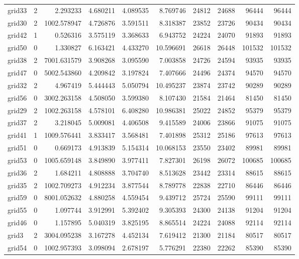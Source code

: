 \begin{longtable}{|l|r|r|r|r|r|r|r|r|r|}
grid33 & 2 & 2.293233 & 4.680211 & 4.089535 & 8.769746 & 24812 & 24688 & 96444 & 96444 \\
grid30 & 2 & 1002.578947 & 4.726876 & 3.591511 & 8.318387 & 23852 & 23726 & 90434 & 90434 \\
grid42 & 1 & 0.526316 & 3.575119 & 3.368633 & 6.943752 & 24224 & 24070 & 91893 & 91893 \\
grid50 & 0 & 1.330827 & 6.163421 & 4.433270 & 10.596691 & 26618 & 26448 & 101532 & 101532 \\
grid38 & 2 & 7001.631579 & 3.908268 & 3.095590 & 7.003858 & 24726 & 24594 & 93935 & 93935 \\
grid47 & 0 & 5002.543860 & 4.209842 & 3.197824 & 7.407666 & 24496 & 24374 & 94570 & 94570 \\
grid32 & 2 & 4.967419 & 5.444443 & 5.050794 & 10.495237 & 23874 & 23742 & 90289 & 90289 \\
grid56 & 0 & 3002.263158 & 4.508050 & 3.599380 & 8.107430 & 21584 & 21464 & 81450 & 81450 \\
grid29 & 2 & 1002.263158 & 4.578101 & 6.408280 & 10.986381 & 25022 & 24852 & 95379 & 95379 \\
grid37 & 2 & 3.218045 & 5.009081 & 4.406508 & 9.415589 & 24006 & 23866 & 91075 & 91075 \\
grid41 & 1 & 1009.576441 & 3.833417 & 3.568481 & 7.401898 & 25312 & 25186 & 97613 & 97613 \\
grid51 & 0 & 0.669173 & 4.913839 & 5.154314 & 10.068153 & 23550 & 23402 & 89981 & 89981 \\
grid53 & 0 & 1005.659148 & 3.849890 & 3.977411 & 7.827301 & 26198 & 26072 & 100685 & 100685 \\
grid36 & 2 & 1.684211 & 4.808888 & 3.704740 & 8.513628 & 23442 & 23314 & 88615 & 88615 \\
grid35 & 2 & 1002.709273 & 4.912234 & 3.877544 & 8.789778 & 22838 & 22710 & 86446 & 86446 \\
grid59 & 0 & 8001.052632 & 4.880258 & 4.559454 & 9.439712 & 25724 & 25590 & 99111 & 99111 \\
grid55 & 0 & 1.097744 & 3.912991 & 5.392402 & 9.305393 & 24300 & 24138 & 91204 & 91204 \\
grid46 & 0 & 1.157895 & 5.040319 & 3.825195 & 8.865514 & 24224 & 24088 & 92114 & 92114 \\
grid3 & 2 & 3004.095238 & 3.167278 & 4.452134 & 7.619412 & 21300 & 21184 & 80517 & 80517 \\
grid54 & 0 & 1002.957393 & 3.098094 & 2.678197 & 5.776291 & 22380 & 22262 & 85390 & 85390 \\

\end{longtable}
